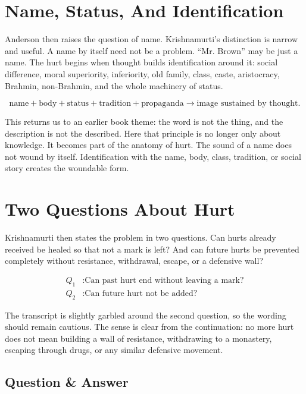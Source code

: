 \documentclass[11pt,oneside]{book}
\begin{document}
\section{Name, Status, And Identification}

Anderson then raises the question of name. Krishnamurti's distinction is narrow and useful. A name by itself need not be a problem. ``Mr. Brown'' may be just a name. The hurt begins when thought builds identification around it: social difference, moral superiority, inferiority, old family, class, caste, aristocracy, Brahmin, non-Brahmin, and the whole machinery of status.

\begin{equation}
\text{name}+\text{body}+\text{status}+\text{tradition}+\text{propaganda}
\longrightarrow
\text{image sustained by thought}.
\end{equation}

This returns us to an earlier book theme: the word is not the thing, and the description is not the described. Here that principle is no longer only about knowledge. It becomes part of the anatomy of hurt. The sound of a name does not wound by itself. Identification with the name, body, class, tradition, or social story creates the woundable form.

\section{Two Questions About Hurt}

Krishnamurti then states the problem in two questions. Can hurts already received be healed so that not a mark is left? And can future hurts be prevented completely without resistance, withdrawal, escape, or a defensive wall?

\begin{align}
Q_1 &: \text{Can past hurt end without leaving a mark?}\\
Q_2 &: \text{Can future hurt not be added?}
\end{align}

The transcript is slightly garbled around the second question, so the wording should remain cautious. The sense is clear from the continuation: no more hurt does not mean building a wall of resistance, withdrawing to a monastery, escaping through drugs, or any similar defensive movement.

\subsection{Question \& Answer}
\end{document}

